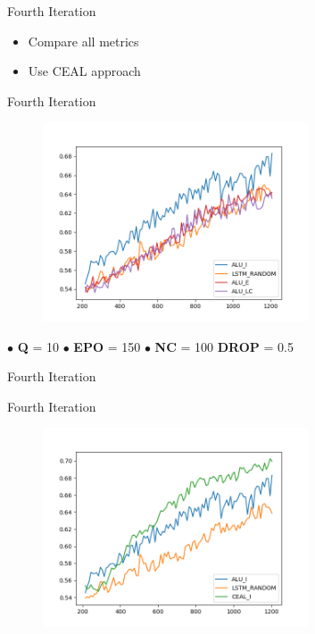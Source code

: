 \documentclass[10pt]{beamer}
\begin{document}
\begin{frame}[fragile]{Fourth Iteration}
\begin{itemize}
    \item Compare all metrics
    \item Use CEAL approach
\end{itemize}
\end{frame}

\begin{frame}[fragile]{Fourth Iteration}
\begin{figure}[H]
    \centering
    \includegraphics[width=0.7\textwidth]{images/acl_n150_q10_full_comparison}
\end{figure}

\hspace{0.5cm} $\bullet$ \textbf{Q} = 10 \hspace{0.5cm} $\bullet$ \textbf{EPO} = 150 \hspace{0.5cm} $\bullet$ \textbf{NC} = 100 \hspace{0.5cm} \textbf{DROP} = 0.5
\end{frame}

\begin{frame}[fragile]{Fourth Iteration}
    
\end{frame}

\begin{frame}[fragile]{Fourth Iteration}
\begin{figure}[H]
    \centering
    \includegraphics[width=0.7\textwidth]{images/acl_n150_q10_ceal_comparison}
\end{figure}

\end{frame}
\end{document}
